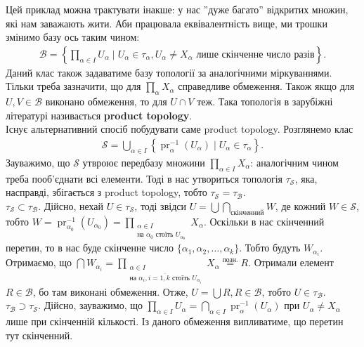 \documentclass[a4paper, 10pt]{article}
\theoremstyle{theoremdd}
\DeclareMathOperator{\pr}{pr}
\begin{document}
\noindent
Цей приклад можна трактувати інакше: у нас ''дуже багато'' відкритих множин, які нам заважають жити. Аби працювала еквівалентність вище, ми трошки змінимо базу ось таким чином:
\begin{align*}
\mathcal{B} = \left\{ \prod_{\alpha \in I} U_\alpha \mid U_\alpha \in \tau_\alpha, U_\alpha \neq X_\alpha \text{ лише скінченне число разів} \right\}.
\end{align*}
Даний клас також задаватиме базу топології за аналогічними міркуваннями. Тільки треба зазначити, що для $\displaystyle\prod_{\alpha} X_\alpha$ справедливе обмеження. Також якщо для $U,V \in \mathcal{B}$ виконано обмеження, то для $U \cap V$ теж. Така топологія в зарубіжні літературі називається \textbf{product topology}.
\bigskip \\
Існує альтернативний спосіб побудувати саме product topology. Розглянемо клас
\begin{align*}
\mathcal{S} = \displaystyle\bigcup_{\alpha \in I}\left\{ \pr_\alpha^{-1}(U_\alpha) \mid U_\alpha \in \tau_\alpha \right\}.
\end{align*}
Зауважимо, що $\mathcal{S}$ утвроює передбазу множини $\displaystyle\prod_{\alpha \in I} X_\alpha$: аналогічним чином треба пооб'єднати всі елементи. Тоді в нас утвориться топологія $\tau_{\mathcal{S}}$, яка, насправді, збігається з product topology, тобто $\tau_{\mathcal{S}} = \tau_{\mathcal{B}}$.\\
$\tau_{\mathcal{S}} \subset \tau_{\mathcal{B}}$. Дійсно, нехай $U \in \tau_{\mathcal{S}}$, тоді звідси $U = \displaystyle\bigcup \bigcap_{\text{скінченний}} W$, де кожний $W \in \mathcal{S}$, тобто $\displaystyle W = \pr_{\alpha_0}^{-1}(U_{\alpha_0}) = \prod_{\substack{\alpha \in I \\ \text{на $\alpha_0$ стоїть $U_{\alpha_0}$}}} X_\alpha$. Оскільки в нас скінченний перетин, то в нас буде скінченне число $\{\alpha_1,\alpha_2,\dots,\alpha_k\}$. Тобто будуть $W_{\alpha_i}$. Отримаємо, що $\displaystyle\bigcap W_{\alpha_i} = \prod_{\substack{\alpha \in I \\ \text{на $\alpha_i, i = \overline{1,k}$ стоїть $U_{\alpha_i}$}}} X_\alpha \overset{\text{позн.}}{=} R$. Отримали елемент $R \in \mathcal{B}$, бо там виконані обмеження. Отже, $U = \displaystyle\bigcup R, R \in \mathcal{B}$, тобто $U \in \tau_{\mathcal{B}}$.\\
$\tau_\mathcal{B} \supset \tau_{\mathcal{S}}$. Дійсно, зауважимо, що $\displaystyle\prod_{\alpha \in I} U_\alpha = \bigcap_{\alpha \in I} \pr_\alpha^{-1}(U_\alpha)$ при $U_\alpha \neq X_\alpha$ лише при скінченній кількості. Із даного обмеження випливатиме, що перетин тут скінченний.
\end{document}
